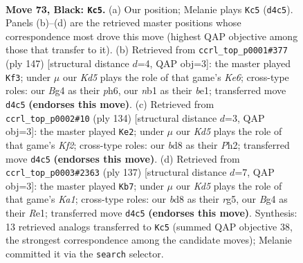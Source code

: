 \documentclass[11pt]{article}
\begin{document}
\clearpage

\begin{figure}[p]\centering
\begin{subfigure}{0.46\textwidth}\centering
\resizebox{\linewidth}{!}{%
\newchessgame
\chessboard[
  setfen={3B4/8/8/8/p1pk2b1/8/5K2/1N6 b - - 1 73},
  showmover=false,
  pgfstyle=straightmove, color=movearrow, markmove={d4-c5}
]}
\caption{}
\end{subfigure}\hfill
\begin{subfigure}{0.46\textwidth}\centering
\resizebox{\linewidth}{!}{%
\newchessgame
\chessboard[
  setfen={8/8/6bP/8/2p5/4k3/4p3/4B1K1 b - - 1 74},
  showmover=false,
  pgfstyle=straightmove, color=movearrow, markmove={e3-f3}
]}
\caption{}
\end{subfigure}
\\[4pt]
\begin{subfigure}{0.46\textwidth}\centering
\resizebox{\linewidth}{!}{%
\newchessgame
\chessboard[
  setfen={3B4/8/8/5p1k/8/4P3/3n1K1P/8 w - - 6 68},
  showmover=false,
  pgfstyle=straightmove, color=movearrow, markmove={f2-e2}
]}
\caption{}
\end{subfigure}\hfill
\begin{subfigure}{0.46\textwidth}\centering
\resizebox{\linewidth}{!}{%
\newchessgame
\chessboard[
  setfen={k7/p7/N7/6R1/8/3K4/8/4r3 b - - 6 69},
  showmover=false,
  pgfstyle=straightmove, color=movearrow, markmove={a8-b7}
]}
\caption{}
\end{subfigure}
\caption{\textbf{Move 73, Black: \texttt{Kc5}.} (a) Our position; Melanie plays \texttt{Kc5} (\texttt{d4c5}). Panels (b)--(d) are the retrieved master positions whose correspondence most drove this move (highest QAP objective among those that transfer to it). (b) Retrieved from \texttt{ccrl\_top\_p0001\#377} (ply 147) [structural distance $d$=4, QAP obj=3]: the master played \texttt{Kf3}; under $\mu$ our \emph{Kd5} plays the role of that game's \emph{Ke6}; cross-type roles: our \emph{B}g4 as their \emph{p}h6, our \emph{n}b1 as their \emph{b}e1; transferred move \texttt{d4c5} \textbf{(endorses this move)}. (c) Retrieved from \texttt{ccrl\_top\_p0002\#10} (ply 134) [structural distance $d$=3, QAP obj=3]: the master played \texttt{Ke2}; under $\mu$ our \emph{Kd5} plays the role of that game's \emph{Kf2}; cross-type roles: our \emph{b}d8 as their \emph{P}h2; transferred move \texttt{d4c5} \textbf{(endorses this move)}. (d) Retrieved from \texttt{ccrl\_top\_p0003\#2363} (ply 137) [structural distance $d$=7, QAP obj=3]: the master played \texttt{Kb7}; under $\mu$ our \emph{Kd5} plays the role of that game's \emph{Ka1}; cross-type roles: our \emph{b}d8 as their \emph{r}g5, our \emph{B}g4 as their \emph{R}e1; transferred move \texttt{d4c5} \textbf{(endorses this move)}. Synthesis: 13 retrieved analogs transferred to \texttt{Kc5} (summed QAP objective 38, the strongest correspondence among the candidate moves); Melanie committed it via the \texttt{search} selector.}
\label{fig:thought-m145}
\end{figure}
\end{document}
